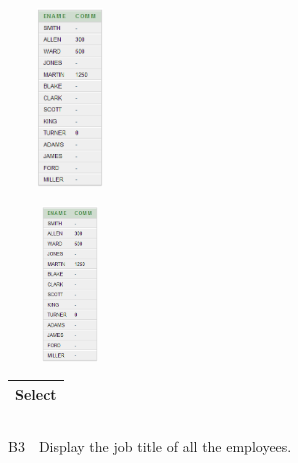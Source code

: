 \begin{center}
  
\includegraphics[width=3.281cm,height=4.748cm]{images/img (18).png}

\end{center}
\begin{center}
  
\includegraphics[width=3.27cm,height=4.12cm]{images/img (19).png}

\end{center}
\begin{flushleft}
\tablefirsthead{}
\tablehead{}
\tabletail{}
\tablelasttail{}
\begin{supertabular}{|m{7.051cm}|}
\hline
Select 

\\\hline
\end{supertabular}
\end{flushleft}
\subsection{}
\subsection{}
\subsection{}
B3\ \ Display the job title of all the employees.



